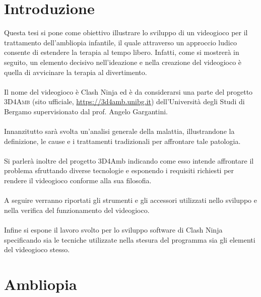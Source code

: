 \documentclass[12pt,a4paper,openright,twoside]{book}
\begin{document}
    
    \newpage
    \thispagestyle{empty}
    \tableofcontents %
    \newpage
    \thispagestyle{empty}
    \chapter*{Introduzione}
    Questa tesi si pone come obiettivo illustrare lo sviluppo di un videogioco per il trattamento dell'ambliopia infantile, il quale attraverso un approccio ludico consente di estendere la terapia al tempo libero. Infatti, come si mostrerà in seguito, un elemento 
    decisivo nell'ideazione e nella creazione del videogioco è quella di avvicinare la terapia al divertimento.  \\\\
    Il nome del videogioco è Clash Ninja ed è da considerarsi una parte del progetto \textsc{3D4Amb} (sito ufficiale, \url{https://3d4amb.unibg.it}) dell'Università degli Studi di Bergamo supervisionato dal prof. Angelo Gargantini. \\\\
    Innanzitutto sarà svolta un’analisi generale della malattia, illustrandone la definizione, le cause e i trattamenti tradizionali per affrontare tale patologia.\\\\
    Si parlerà inoltre del progetto 3D4Amb indicando come esso intende affrontare il problema sfruttando diverse tecnologie e 
    esponendo i requisiti richiesti per rendere il videogioco conforme alla sua filosofia.\\\\
    A seguire verranno riportati gli strumenti e gli accessori utilizzati nello sviluppo e nella verifica del funzionamento del videogioco. \\\\
    Infine si espone il lavoro svolto per lo sviluppo software di Clash Ninja specificando sia le tecniche utilizzate nella stesura del programma sia gli elementi del videogioco stesso.
    
    \newpage  
    \thispagestyle{empty}
    
    
    \chapter{Ambliopia}
\end{document}
